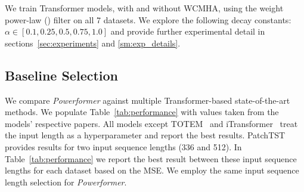 We train Transformer models, with and without WCMHA, using the weight power-law (\fpl) filter on all 7 datasets.
We explore the following decay constants: $\alpha \in [0.1, 0.25, 0.5, 0.75, 1.0]$ and provide further experimental detail in sections~\ref{sec:experiments} and \ref{sm:exp_details}.

\subsection{Baseline Selection}
We compare \emph{Powerformer} against multiple Transformer-based state-of-the-art methods.
We populate Table~\ref{tab:performance} with values taken from the models' respective papers.
All models except TOTEM~\cite{talukder2024totem} and iTransformer~\cite{liu2024itransformer} treat the input length as a hyperparameter and report the best results.
PatchTST~\cite{nie.patchtst.2023a} provides results for two input sequence lengths (336 and 512).
In Table~\ref{tab:performance} we report the best result between these input sequence lengths for each dataset based on the MSE.
We employ the same input sequence length selection for \emph{Powerformer}.
